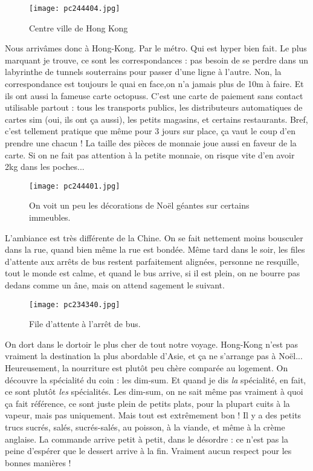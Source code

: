 \documentclass{book}
\begin{document}
\begin{figure}[h]
\centering
\texttt{[image: pc244404.jpg]}
\caption*{Centre ville de Hong Kong}
\end{figure}

Nous arrivâmes donc à Hong-Kong. Par le métro. Qui est hyper bien fait. Le plus marquant je trouve, ce sont les correspondances : pas besoin de se perdre dans un labyrinthe de tunnels souterrains pour passer d'une ligne à l'autre. Non, la correspondance est toujours le quai en face,on n'a jamais plus de 10m à faire. Et ils ont aussi la fameuse carte octopuss. C'est une carte de paiement sans contact utilisable partout : tous les transports publics, les distributeurs automatiques de cartes sim (oui, ils ont ça aussi), les petits magasins, et certains restaurants. Bref, c'est tellement pratique que même pour 3 jours sur place, ça vaut le coup d'en prendre une chacun ! La taille des pièces de monnaie joue aussi en faveur de la carte. Si on ne fait pas attention à la petite monnaie, on risque vite d'en avoir 2kg dans les poches...


\begin{figure}[h]
\centering
\texttt{[image: pc244401.jpg]}
\caption*{On voit un peu les décorations de Noël géantes sur certains immeubles.}
\end{figure}

L'ambiance est très différente de la Chine. On se fait nettement moins bousculer dans la rue, quand bien même la rue est bondée. Même tard dans le soir, les files d'attente aux arrêts de bus restent parfaitement alignées, personne ne resquille, tout le monde est calme, et quand le bus arrive, si il est plein, on ne bourre pas dedans comme un âne, mais on attend sagement le suivant.


\begin{wrapfigure}{l}{0.55\textwidth}
\centering
\texttt{[image: pc234340.jpg]}
\caption*{File d'attente à l'arrêt de bus.}
\end{wrapfigure}

On dort dans le dortoir le plus cher de tout notre voyage. Hong-Kong n'est pas vraiment la destination la plus abordable d'Asie, et ça ne s'arrange pas à Noël... Heureusement, la nourriture est plutôt peu chère comparée au logement. On découvre la spécialité du coin : les dim-sum. Et quand je dis \emph{la} spécialité, en fait, ce sont plutôt \emph{les} spécialités. Les dim-sum, on ne sait même pas vraiment à quoi ça fait référence, ce sont juste plein de petits plats, pour la plupart cuits à la vapeur, mais pas uniquement. Mais tout est extrêmement bon ! Il y a des petits trucs sucrés, salés, sucrés-salés, au poisson, à la viande, et même à la crème anglaise. La commande arrive petit à petit, dans le désordre : ce n'est pas la peine d'espérer que le dessert arrive à la fin. Vraiment aucun respect pour les bonnes manières !
\end{document}
